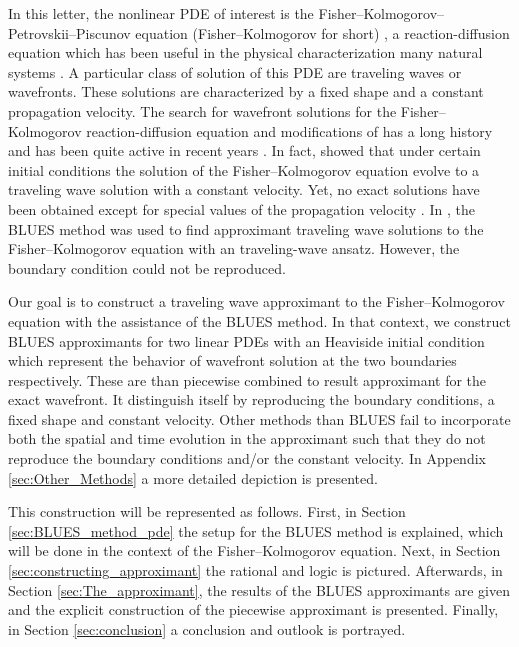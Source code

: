 \documentclass[amsmath,amssymb,amsfonts,aps,pre,preprint,superscriptaddress,bibnotes,showpacs,showkeys,longbibliography]{revtex4-1}
\begin{document}
In this letter, the nonlinear PDE of interest is the Fisher–Kolmogorov–Petrovskii–Piscunov equation (Fisher–Kolmogorov for short) \cite{fisher1937wave, kolmogorov1937study}, a reaction-diffusion equation which has been useful in the physical characterization many natural systems \cite{canosa1973nonlinear,ross2010generalized,hamel2011speedup, gueron1989model, Bewick2017Invasion}. A particular class of solution of this PDE are traveling waves or wavefronts. These solutions are characterized by a fixed shape and a constant propagation velocity. The search for wavefront solutions for the Fisher–Kolmogorov reaction-diffusion equation and modifications of has a long history and has been quite active in recent years \cite{Mishra2012,Mansour2010,Yuan2013general}. In fact, \citet{kolmogorov1937study} showed that under certain initial conditions the solution of the Fisher–Kolmogorov equation evolve to a traveling wave solution with a constant velocity. Yet, no exact solutions have been obtained except for special values of the propagation velocity \cite{Ablowitz1979}. In \citet{Berx_2020}, the BLUES method was used to find approximant traveling wave solutions to the Fisher–Kolmogorov equation with an traveling-wave ansatz. However, the boundary condition could not be reproduced. %

Our goal is to construct a traveling wave approximant to the Fisher–Kolmogorov equation with the assistance of the BLUES method. In that context, we construct BLUES approximants for two linear PDEs with an Heaviside initial condition which represent the behavior of wavefront solution at the two boundaries respectively. These are than piecewise combined to result approximant for the exact wavefront. It distinguish itself by reproducing the boundary conditions, a fixed shape and constant velocity. Other methods than BLUES fail to incorporate both the spatial and time evolution in the approximant such that they do not reproduce the boundary conditions and/or the constant velocity. In Appendix \ref{sec:Other_Methods} a more detailed depiction is presented.

This construction will be represented as follows. First, in Section \ref{sec:BLUES_method_pde} the setup for the BLUES method is explained, which will be done in the context of the Fisher–Kolmogorov equation. Next, in Section \ref{sec:constructing_approximant} the rational and logic is pictured. Afterwards, in Section \ref{sec:The_approximant}, the results of the BLUES approximants are given and the explicit construction of the piecewise approximant is presented. Finally, in Section \ref{sec:conclusion} a conclusion and outlook is portrayed.
\end{document}
